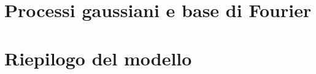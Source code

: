 \section{Processi gaussiani e base di Fourier} \label{sec:GP}

\section{Riepilogo del modello} \label{sec:riepilogo_modello}
